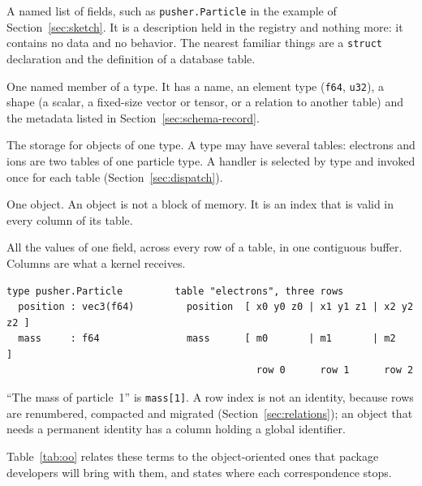 \documentclass[11pt,a4paper]{article}
\newcommand{\code}[1]{\texttt{#1}}
\begin{document}
\begin{description}[style=nextline,leftmargin=2em]
  \item[Type.]
        A named list of fields, such as \code{pusher.Particle} in the
        example of Section~\ref{sec:sketch}.  It is a
        description held in the registry and nothing more: it contains no
        data and no behavior.  The nearest familiar things are a
        \code{struct} declaration and the definition of a database table.
  \item[Field.]
        One named member of a type.  It has a name, an element type
        (\code{f64}, \code{u32}), a shape (a scalar, a fixed-size vector or
        tensor, or a relation to another table) and the metadata listed in
        Section~\ref{sec:schema-record}.
  \item[Table.]
        The storage for objects of one type.  A type may have several
        tables: electrons and ions are two tables of one particle type.  A
        handler is selected by type and invoked once for each table
        (Section~\ref{sec:dispatch}).
  \item[Row.]
        One object.  An object is not a block of memory.  It is an index
        that is valid in every column of its table.
  \item[Column.]
        All the values of one field, across every row of a table, in one
        contiguous buffer.  Columns are what a kernel receives.
\end{description}

\begin{lstlisting}
type pusher.Particle         table "electrons", three rows
  position : vec3(f64)         position  [ x0 y0 z0 | x1 y1 z1 | x2 y2 z2 ]
  mass     : f64               mass      [ m0       | m1       | m2       ]
                                           row 0      row 1      row 2
\end{lstlisting}

\enquote{The mass of particle~1} is \code{mass[1]}.  A row index is not an
identity, because rows are renumbered, compacted and migrated
(Section~\ref{sec:relations}); an object that needs a permanent identity has
a column holding a global identifier.

Table~\ref{tab:oo} relates these terms to the object-oriented ones that
package developers will bring with them, and states where each
correspondence stops.
\end{document}
